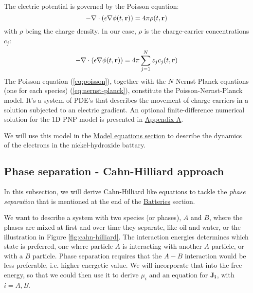 \documentclass[12pt]{article}
\begin{document}
The electric potential is governed by the Poisson equation:
\begin{equation}
    -\nabla \cdot (\epsilon \nabla \phi(t, {\bf r})) = 4 \pi \rho (t, {\bf r})   
\end{equation}
 with $\rho$ being the charge density. In our case, $\rho$ is the charge-carrier concentrations $c_j$:
\begin{equation} \label{eq:poisson}
    -\nabla \cdot (\epsilon \nabla \phi(t, {\bf r})) = 4\pi \sum _{j=1} ^N z_j c_j (t, {\bf r})  
\end{equation}
\newline 
The Poisson equation (\ref{eq:poisson}), together with the $N$ Nernst-Planck equations (one for each species) (\ref{eq:nernst-planck}), constitute the Poisson-Nernst-Planck model. It's a system of PDE's that describes the movement of charge-carriers in a solution subjected to an electric gradient. An optional finite-difference numerical solution for the 1D PNP model is presented in \hyperref[sec:appendix-a]{Appendix A}.

We will use this model in the \hyperref[sec:model-equations]{Model equations section} to describe the dynamics of the electrons in the nickel-hydroxide battary. 

\subsection{Phase separation - Cahn-Hilliard approach} \label{sec:Cahn-Hilliard}
 In this subsection, we will derive Cahn-Hilliard like equations to tackle the \textit{phase separation} that is mentioned at the end of the \hyperref[sec:batt]{Batteries} section.

We want to describe a system with two species (or phases), $A$ and $B$, where the phases are mixed at first and over time they separate, like oil and water, or the illustration in Figure \ref{fig:cahn-hilliard}. The interaction energies determines which state is preferred, one where particle $A$ is interacting with another $A$ particle, or with a $B$ particle. Phase separation requires that the $A-B$ interaction would be less preferable, i.e. higher energetic value. We will incorporate that into the free energy, so that we could then use it to derive $\mu_i$ and an equation for $\bf J_i$, with $i=A,B$. 
\newline \newline \newline \newline
\end{document}
